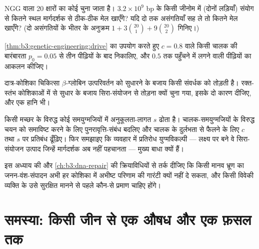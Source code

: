 \begin{exercise}[$\star\star$]\label{exo:b3:genetic-engineering:8}
NGG  वाला 20 क्षारों का कोई  चुना जाता है।
$3.2\times 10^{9}$ bp के किसी जीनोम में (दोनों लड़ियाँ) संयोग से कितने
स्थल मार्गदर्शक से ठीक-ठीक मेल खाएँगे? यदि  दो तक असंगतियाँ सह ले
तो कितने मेल खाएँगे? (दो असंगतियों के भीतर के अनुक्रम $1 + 3\binom{20}{1} +
9\binom{20}{2}$ गिनिए।)
\end{exercise}

\begin{exercise}[$\star\star$]\label{exo:b3:genetic-engineering:9}
\cref{thm:b3:genetic-engineering:drive} का उपयोग करते हुए
$c = 0.8$ वाले किसी चालक की बारंबारता $p_{0} = 0.05$ से तीन पीढ़ियों के
बाद निकालिए, और $0.5$ तक पहुँचने में लगने वाली पीढ़ियों का आकलन कीजिए।
\end{exercise}

\begin{exercise}[$\star\star\star$]\label{exo:b3:genetic-engineering:10}
दात्र-कोशिका चिकित्सा $\beta$-ग्लोबिन उत्परिवर्तन को सुधारने के बजाय
किसी संवर्धक को तोड़ती है। रक्त-स्तंभ कोशिकाओं में 
से सुधार के बजाय सिरा-संयोजन से तोड़ना क्यों चुना गया, इसके दो कारण
दीजिए, और एक हानि भी।
\end{exercise}

\begin{exercise}[$\star\star\star$]\label{exo:b3:genetic-engineering:11}
किसी मच्छर के विरुद्ध कोई  समयुग्मजियों में अनुकूलता-लागत $s$
ढोता है। चालक-समयुग्मजियों के विरुद्ध चयन को समाविष्ट करने के लिए
पुनरावृत्ति-संबंध बदलिए और चालक के दुर्लभता से फैलने के लिए $c$ तथा
$s$ पर प्रतिबंध ढूँढ़िए। फिर समझाइए कि व्यवहार में प्रतिरोध
युग्मविकल्पी --- लक्ष्य पर बने वे सिरा-संयोजन उत्पाद जिन्हें मार्गदर्शक
अब नहीं पहचानता --- मुख्य बाधा क्यों हैं।
\end{exercise}

\begin{exercise}[$\star\star\star$]\label{exo:b3:genetic-engineering:12}
इस अध्याय की और \cref{ch:b3:dna-repair} की क्रियाविधियों से तर्क दीजिए
कि किसी मानव भ्रूण का जनन-वंश-संपादन अभी हर कोशिका में अभीष्ट परिणाम
की गारंटी क्यों नहीं दे सकता, और किसी विवेकी व्यक्ति के उसे सुरक्षित
मानने से पहले कौन-से प्रमाण चाहिए होंगे।
\end{exercise}

\section{समस्या: किसी जीन से एक औषध और एक फ़सल तक}

